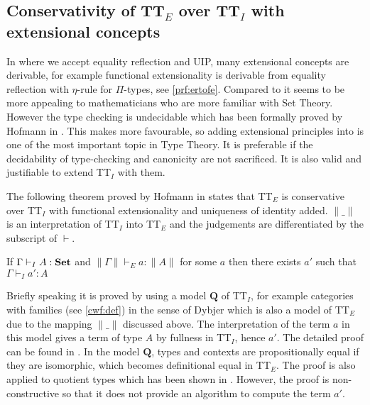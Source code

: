 \subsection{Conservativity of TT$_E$ over TT$_I$ with extensional concepts}

In \ett where we accept equality reflection and UIP, many extensional concepts are derivable, for example functional extensionality is derivable from equality reflection with $\eta$-rule for $\Pi$-types, see \autoref{prf:ertofe}. Compared to \itt it seems to be more appealing to mathematicians who are more familiar with Set Theory. However the type checking is undecidable which has been formally proved by Hofmann in \cite{hof:phd}. This makes \itt more favourable, so adding extensional principles into \itt  
is one of the most important topic in Type Theory. It is preferable if the decidability of type-checking and canonicity are not sacrificed. 
It is also valid and justifiable to extend TT$_I$ with them. 

The following theorem proved by Hofmann in \cite{hof:95:con} states that TT$_E$ is conservative over TT$_I$ with functional extensionality and uniqueness of identity added. $\|\_\|$ is an interpretation of TT$_I$ into TT$_E$ and the judgements are differentiated by the subscript of $\vdash$.

\begin{theorem}
If $\Gamma \vdash_I A : \operatorname{\mathbf{Set}}$ and $\| \Gamma \| \vdash_E a : \| A \|$ for some $a$ then there exists $a'$ such that $\Gamma \vdash_I a' : A$
\end{theorem}


Briefly speaking it is proved by using a model $\mathbf{Q}$ of TT$_I$, for example categories with families (see \autoref{cwf:def}) in the sense of Dybjer which is also a model of TT$_E$ due to the mapping $\|\_\|$ discussed above. The interpretation of the term $a$ in this model gives a term of type $A$ by fullness in TT$_I$, hence $a'$. The detailed proof can be found in \cite{hof:95:con}. In the model $\mathbf{Q}$, types and contexts are propositionally equal if they are isomorphic, which becomes definitional equal in TT$_E$. The proof is also applied to quotient types which has been shown in \cite{hof:phd}.
However, the proof is non-constructive so that it does not provide an algorithm to compute the term $a'$.








